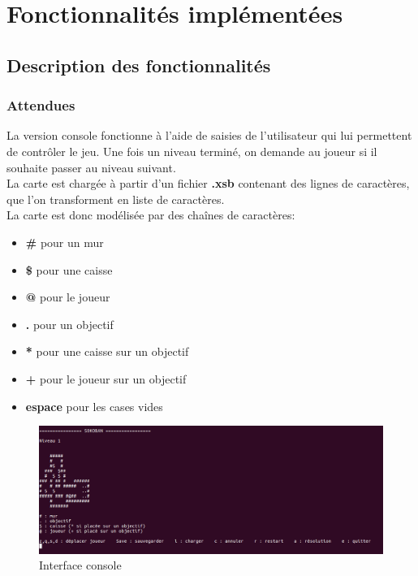 \documentclass[a4paper,12pt]{article} %
\begin{document}
\section{Fonctionnalités implémentées}

\subsection{Description des fonctionnalités}

\subsubsection*{Attendues}

La version console fonctionne à l'aide de saisies de l'utilisateur qui lui permettent de contrôler le jeu. Une fois un niveau terminé, on demande au joueur si il souhaite passer au niveau suivant.\\

La carte est chargée à partir d'un fichier \textbf{.xsb} contenant des lignes de caractères, que l'on transforment en liste de caractères.\\
La carte est donc modélisée par des chaînes de caractères:
\begin{itemize}
\item \textbf{\#} pour un mur
\item \textbf{\$} pour une caisse
\item \textbf{@} pour le joueur
\item \textbf{.} pour un objectif
\item \textbf{*} pour une caisse sur un objectif
\item \textbf{+} pour le joueur sur un objectif
\item \textbf{espace} pour les cases vides
\end{itemize}

\begin{figure}[!h]
\centering
\includegraphics[scale=0.35]{images/Capture.png}
\caption{Interface console}
\end{figure}
\end{document}
